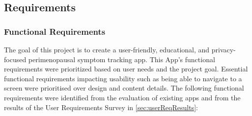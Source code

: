 \subsection{Requirements}

\subsubsection{Functional Requirements}
The goal of this project is to create a user-friendly, educational, and privacy-focused perimenopausal symptom tracking app. This App's functional requirements were prioritized based on user needs and the project goal. Essential functional requirements impacting usability such as being able to navigate to a screen were prioritised over design and content details. The following functional requirements were identified from the evaluation of existing apps and from the results of the User Requirements Survey in \ref{sec:userReqResults}:

